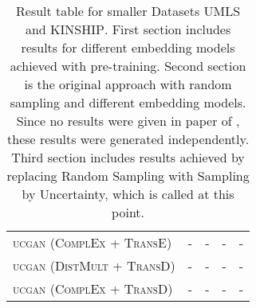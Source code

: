 \begin{table}[h]
\begin{tabular}{lllll}
         \textsc{ucgan} (\textsc{ComplEx} + \textsc{TransE}) 
          & -  & - & - & -\\
          
          \textsc{ucgan} (\textsc{DistMult} + \textsc{TransD}) 
          & -  & - & - & - \\
        
        \textsc{ucgan} (\textsc{ComplEx} + \textsc{TransD}) 
          & -  & - & - & - \\
        \bottomrule
    \end{tabular}
    \caption{Result table for smaller Datasets \textsc{UMLS} and \textsc{KINSHIP}.
    First section includes results for different embedding models achieved with pre-training.
    Second section is the original \kbgan approach with random sampling and different embedding models. Since no results were given in paper of \kbgan \cite{cai2017kbgan}, these results were generated independently.
    Third section includes results achieved by replacing Random Sampling with Sampling by Uncertainty, which is called \ucgan at this point.}
\label{tab:results}
\end{table}